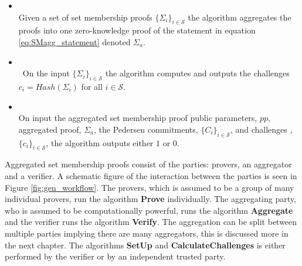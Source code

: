 \begin{Mydef}
\begin{itemize}
\item {} \\
Given a set of set membership proofs  $\{ \Sigma_{i}\}_{i\in\mathcal{S}}$ the algorithm aggregates the proofs into one zero-knowledge proof of the statement in equation \eqref{eq:SMagg_statement} denoted $\Sigma_a$. 

\item {}\\\
On the input $\{\Sigma_i\}_{i\in\mathcal{S}}$ the algorithm computes and outputs the challenges  $c_i = Hash(\Sigma_i)$ for all $i\in\mathcal{S}$.

\item{} \\
On input the aggregated set membership proof public parameters, $pp$, aggregated proof, $\Sigma_a$, the Pedersen commitments, $\{C_i\}_{i\in\mathcal{S}}$, and challenges ,$\{c_i\}_{i\in\mathcal{S}}$, the algorithm outputs either $1$ or $0$. 
\end{itemize}

\end{Mydef}
\vspace{10pt}

Aggregated set membership proofs consist of the parties: provers, an aggregator and a verifier. A schematic figure of the interaction between the parties is seen in Figure \ref{fig:gen_workflow}. The provers, which is assumed to be a group of many individual provers, run the algorithm \textbf{Prove} individually. The aggregating party, who is assumed to be computationally powerful, runs the algorithm \textbf{Aggregate} and the verifier runs the algorithm \textbf{Verify}.  The aggregation can be split between multiple parties implying there are many aggregators, this is discussed more in the next chapter. The algorithms \textbf{SetUp} and \textbf{CalculateChallenges} is either performed by the verifier or by an independent trusted party.

